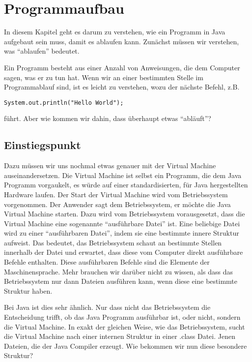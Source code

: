
\chapter{Programmaufbau}

In diesem Kapitel geht es darum zu verstehen, wie ein Programm in Java aufgebaut sein muss, damit es ablaufen kann. Zunächst müssen wir verstehen, was "`ablaufen"' bedeutet. 

Ein Programm besteht aus einer Anzahl von Anweisungen, die dem Computer sagen, was er zu tun hat. Wenn wir an einer bestimmten Stelle im Programmablauf sind, ist es leicht zu verstehen, wozu der nächste Befehl, z.B.
\begin{lstlisting}
System.out.println("Hello World");
\end{lstlisting}
führt. Aber wie kommen wir dahin, dass überhaupt etwas "`abläuft"'?

\section{Einstiegspunkt}

Dazu müssen wir uns nochmal etwas genauer mit der Virtual Machine auseinandersetzen. Die Virtual Machine ist selbst ein Programm, die dem Java Programm vorgaukelt, es würde auf einer standardisierten, für Java hergestellten Hardware laufen. Der Start der Virtual Machine wird vom Betriebssystem vorgenommen. Der Anwender sagt dem Betriebssystem, er möchte die Java Virtual Machine starten. Dazu wird vom Betriebssystem vorausgesetzt, dass die Virtual Machine eine sogenannte "`ausführbare Datei"' ist. Eine beliebige Datei wird zu einer "`ausführbaren Datei"', indem sie eine bestimmte innere Struktur aufweist. Das bedeutet, das Betriebssystem schaut an bestimmte Stellen innerhalb der Datei und erwartet, dass diese vom Computer direkt ausführbare Befehle enthalten. Diese ausführbaren Befehle sind die Elemente der Maschinensprache. Mehr brauchen wir darüber nicht zu wissen, als dass das Betriebssystem nur dann Dateien ausführen kann, wenn diese eine bestimmte Struktur haben. 

Bei Java ist dies sehr ähnlich. Nur dass nicht das Betriebssystem die Entscheidung trifft, ob das Java Programm ausführbar ist, oder nicht, sondern die Virtual Machine. In exakt der gleichen Weise, wie das Betriebssystem, sucht die Virtual Machine nach einer internen Struktur in einer .class Datei. Jenen Dateien, die der Java Compiler erzeugt. Wie bekommen wir nun diese besondere Struktur?

